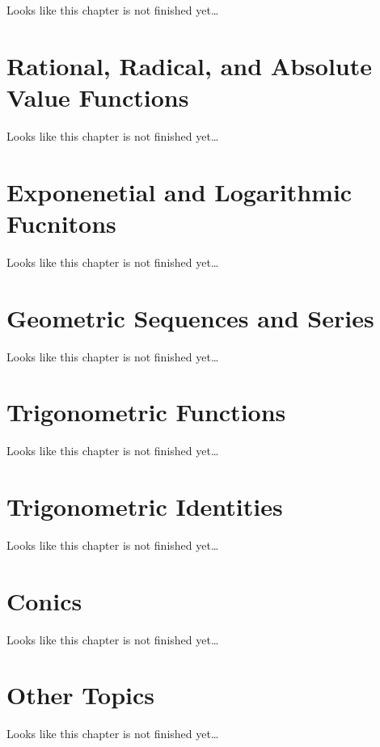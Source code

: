 \documentclass[
]{book}
\theoremstyle{definition}
\theoremstyle{definition}
\theoremstyle{definition}
\theoremstyle{definition}
\theoremstyle{remark}
\begin{document}
Looks like this chapter is not finished yet\ldots{}

\hypertarget{rational-radical-and-absolute-value-functions}{%
\chapter{Rational, Radical, and Absolute Value Functions}\label{rational-radical-and-absolute-value-functions}}

Looks like this chapter is not finished yet\ldots{}

\hypertarget{exponenetial-and-logarithmic-fucnitons}{%
\chapter{Exponenetial and Logarithmic Fucnitons}\label{exponenetial-and-logarithmic-fucnitons}}

Looks like this chapter is not finished yet\ldots{}

\hypertarget{geometric-sequences-and-series}{%
\chapter{Geometric Sequences and Series}\label{geometric-sequences-and-series}}

Looks like this chapter is not finished yet\ldots{}

\hypertarget{trigonometric-functions}{%
\chapter{Trigonometric Functions}\label{trigonometric-functions}}

Looks like this chapter is not finished yet\ldots{}

\hypertarget{trigonometric-identities}{%
\chapter{Trigonometric Identities}\label{trigonometric-identities}}

Looks like this chapter is not finished yet\ldots{}

\hypertarget{conics}{%
\chapter{Conics}\label{conics}}

Looks like this chapter is not finished yet\ldots{}

\hypertarget{other-topics}{%
\chapter{Other Topics}\label{other-topics}}

Looks like this chapter is not finished yet\ldots{}
\end{document}

